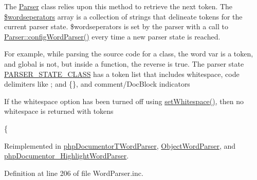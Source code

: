 \-The \hyperlink{class_parser}{\-Parser} class relies upon this method to retrieve the next token. \-The \hyperlink{class_word_parser_a71e405c46bb9f4fc20444b174a15829b}{\$wordseperators} array is a collection of strings that delineate tokens for the current parser state. \$wordseperators is set by the parser with a call to \hyperlink{class_parser_a283368f67f931488905c6f3f84b1c549}{\-Parser\-::config\-Word\-Parser()} every time a new parser state is reached.

\-For example, while parsing the source code for a class, the word {\ttfamily var} is a token, and {\ttfamily global} is not, but inside a function, the reverse is true. \-The parser state \hyperlink{}{\-P\-A\-R\-S\-E\-R\-\_\-\-S\-T\-A\-T\-E\-\_\-\-C\-L\-A\-S\-S} has a token list that includes whitespace, code delimiters like ; and \{\}, and comment/\-Doc\-Block indicators

\-If the whitespace option has been turned off using \hyperlink{class_word_parser_a6b3c5739a63c39226c2f0273eb2f24a2}{set\-Whitespace()}, then no whitespace is returned with tokens

\{ 

\-Reimplemented in \hyperlink{classphp_documentor_t_word_parser_aed2fad5b3be15693fc9b44b7b73af497}{php\-Documentor\-T\-Word\-Parser}, \hyperlink{class_object_word_parser_aed2fad5b3be15693fc9b44b7b73af497}{\-Object\-Word\-Parser}, and \hyperlink{classphp_documentor___highlight_word_parser_aed2fad5b3be15693fc9b44b7b73af497}{php\-Documentor\-\_\-\-Highlight\-Word\-Parser}.



\-Definition at line 206 of file \-Word\-Parser.\-inc.



